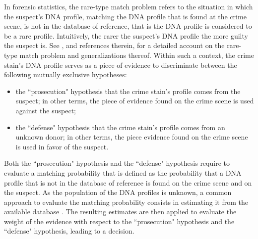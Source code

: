 \documentclass{article}
\newcommand{\1}{\boldsymbol{1}}
\theoremstyle{plain}
\begin{document}
In forensic statistics, the rare-type match problem refers to the situation in which the suspect's DNA profile, matching the DNA profile that is found at the crime scene, is not in the database of reference, that is the DNA profile is considered to be a rare profile. Intuitively, the rarer the suspect's DNA profile the more guilty the suspect is. See \cite{Bre(10)}, and references therein, for a detailed account on the rare-type match problem and generalizations thereof. Within such a context, the crime stain's DNA profile serves as a piece of evidence to discriminate between the following mutually exclusive hypotheses:
\begin{itemize}
\item[i)] the ``prosecution" hypothesis that the crime stain's profile comes from the suspect; in other terms, the piece of evidence found on the crime scene is used against the suspect;
\item[ii)]  the ``defense" hypothesis that the crime stain's profile comes from an unknown donor; in other terms, the piece evidence found on the crime scene is used in favor of the suspect. 
\end{itemize}
Both the ``prosecution" hypothesis and the ``defense" hypothesis require to evaluate a matching probability that is defined as the probability that a DNA profile that is not in the database of reference is found on the crime scene and on the suspect. As the population of the DNA profiles is unknown, a common approach to evaluate the matching probability consists in estimating it from the available database \cite{Bre(10),Cer(17),Cer(20)}. The resulting estimates are then applied to evaluate the weight of the evidence with respect to the ``prosecution" hypothesis and the ``defense" hypothesis, leading to a decision. 
\end{document}
